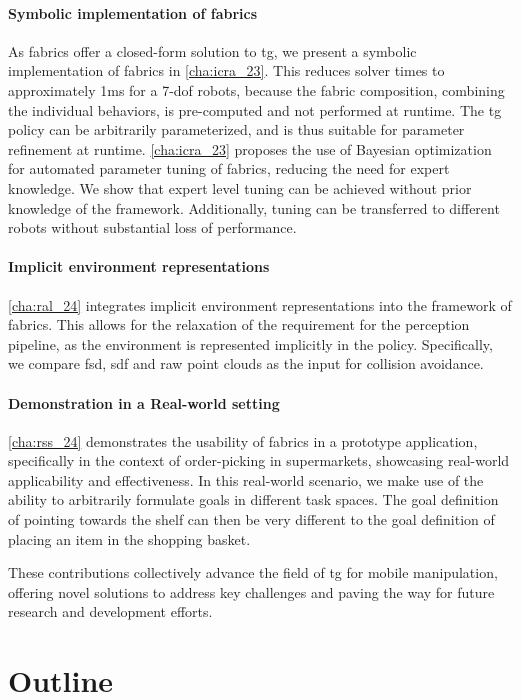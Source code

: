\paragraph{Symbolic implementation of \ac{fabrics}}
As \ac{fabrics} offer a closed-form solution to
\ac{tg}, we present a symbolic implementation of
\ac{fabrics} in \cref{cha:icra_23}. This reduces
solver times to approximately 1ms for a 7-\ac{dof} robots, 
because the fabric composition, combining
the individual behaviors, is pre-computed and not
performed at runtime. The \ac{tg} policy can be
arbitrarily parameterized, and is thus suitable for
parameter refinement at runtime.
\cref{cha:icra_23} proposes the use of Bayesian optimization for
automated parameter tuning of \ac{fabrics},
reducing the need for expert knowledge. We show that
expert level tuning can be achieved without prior
knowledge of the framework. Additionally, tuning can
be transferred to different robots without substantial
loss of performance.

\paragraph{Implicit environment representations}
\cref{cha:ral_24} integrates implicit environment
representations into the framework of \ac{fabrics}.
This allows for the relaxation of the requirement for
the perception pipeline, as the environment is
represented implicitly in the policy.
Specifically, we compare \ac{fsd}, \ac{sdf} and raw
point clouds as the input for collision avoidance.

\paragraph{Demonstration in a Real-world setting}
\cref{cha:rss_24} demonstrates the usability of \ac{fabrics}
in a prototype application, specifically in the
context of order-picking in supermarkets, showcasing
real-world applicability and effectiveness. In this
real-world scenario, we make use of the ability
to arbitrarily formulate goals in different task
spaces. The goal definition of pointing towards the
shelf can then be very different to the goal
definition of placing an item in the shopping basket.

These contributions collectively advance the field of
\ac{tg} for mobile manipulation, offering novel
solutions to address key challenges and paving the way for
future research and development efforts.

\section{Outline}


